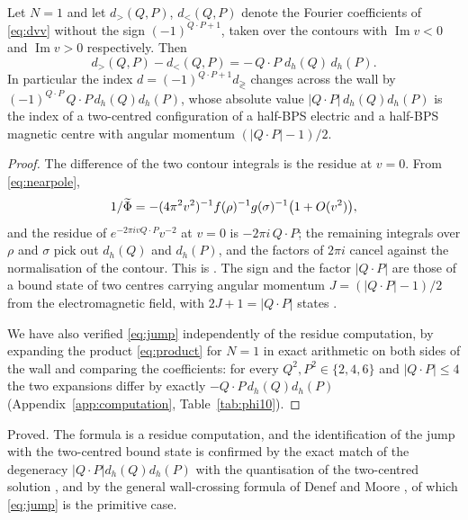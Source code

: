 \begin{theorem}\label{thm:wallcrossing}
Let $N=1$ and let $d_{>}(Q,P)$, $d_{<}(Q,P)$ denote the Fourier coefficients of \eqref{eq:dvv} without the sign $(-1)^{Q\cdot P+1}$, taken over the contours with $\operatorname{Im}v<0$ and $\operatorname{Im}v>0$ respectively. Then
\begin{equation}\label{eq:jump}
d_{>}(Q,P) - d_{<}(Q,P) = -\,Q\cdot P\; d_h(Q)\, d_h(P).
\end{equation}
In particular the index $d = (-1)^{Q\cdot P+1}d_{\gtrless}$ changes across the wall by $(-1)^{Q\cdot P}\,Q\cdot P\,d_h(Q)d_h(P)$, whose absolute value $|Q\cdot P|\,d_h(Q)d_h(P)$ is the index of a two-centred configuration of a half-BPS electric and a half-BPS magnetic centre with angular momentum $(|Q\cdot P|-1)/2$.
\end{theorem}

\begin{proof}
The difference of the two contour integrals is the residue at $v=0$. From \eqref{eq:nearpole},
\[
1/\widetilde{\Phi} = -(4\pi^2v^2)^{-1}f(\rho)^{-1}g(\sigma)^{-1}\bigl(1+O(v^2)\bigr),
\]
and the residue of $e^{-2\pi i v Q\cdot P}v^{-2}$ at $v=0$ is $-2\pi i\,Q\cdot P$; the remaining integrals over $\rho$ and $\sigma$ pick out $d_h(Q)$ and $d_h(P)$, and the factors of $2\pi i$ cancel against the normalisation of the contour. This is \cite[eq.~(2.13)]{Sen07twocentred}. The sign and the factor $|Q\cdot P|$ are those of a bound state of two centres carrying angular momentum $J = (|Q\cdot P|-1)/2$ from the electromagnetic field, with $2J+1 = |Q\cdot P|$ states \cite{Sen07twocentred,DenefMoore11}.

We have also verified \eqref{eq:jump} independently of the residue computation, by expanding the product \eqref{eq:product} for $N=1$ in exact arithmetic on both sides of the wall and comparing the coefficients: for every $Q^2,P^2\in\{2,4,6\}$ and $|Q\cdot P|\le 4$ the two expansions differ by exactly $-Q\cdot P\,d_h(Q)d_h(P)$ (Appendix~\ref{app:computation}, Table~\ref{tab:phi10}).
\end{proof}

\begin{verdict}[claim 7]
Proved. The formula is a residue computation, and the identification of the jump with the two-centred bound state is confirmed by the exact match of the degeneracy $|Q\cdot P|d_h(Q)d_h(P)$ with the quantisation of the two-centred solution \cite{Sen07twocentred}, and by the general wall-crossing formula of Denef and Moore \cite{DenefMoore11}, of which \eqref{eq:jump} is the primitive case.
\end{verdict}

